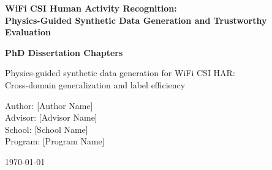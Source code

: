 \documentclass[12pt,a4paper,oneside]{book}
\begin{document}
\pagestyle{fancy}
\fancyhf{}
\fancyhead[L]{\leftmark}
\fancyhead[R]{\thepage}
\renewcommand{\headrulewidth}{0.4pt}

\onehalfspacing

\begin{titlepage}
\centering
\vspace*{2cm}

{\Huge\bfseries WiFi CSI Human Activity Recognition:\\ Physics-Guided Synthetic Data Generation and Trustworthy Evaluation}

\vspace{1cm}

{\Large\bfseries PhD Dissertation Chapters}

\vspace{2cm}

{\large
Physics-guided synthetic data generation for WiFi CSI HAR:\\
Cross-domain generalization and label efficiency
}

\vspace{2cm}

{\large 
Author: [Author Name]\\
Advisor: [Advisor Name]\\
School: [School Name]\\
Program: [Program Name]
}

\vspace{2cm}

{\large \today}

\end{titlepage}

\tableofcontents
\newpage

\listoffigures
\listoftables
\newpage

\printglossary[type=\acronymtype,title=Acronyms]
\newpage





\appendix






\end{document}
